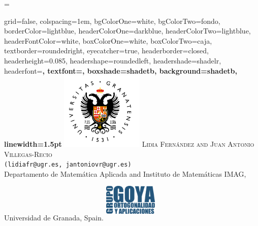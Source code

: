\documentclass[portrait,final,a0paper,fontscale=0.38]{baposter}
\begin{document}
\emergencystretch=\maxdimen
{}
\begin{poster}%
  {
  grid=false,
  colspacing=1em,
  bgColorOne=white,
  bgColorTwo=fondo,
  borderColor=lightblue,
  headerColorOne=darkblue,
  headerColorTwo=lightblue,
  headerFontColor=white,
  boxColorOne=white,
  boxColorTwo=caja,
 textborder=roundedright,
  eyecatcher=true,
  headerborder=closed,
  headerheight=0.085\textheight,
  headershape=roundedleft,
  headershade=shadelr,
  headerfont=\Large\bf\textsc, %
  textfont={\setlength{\parindent}{1.5em}},
  boxshade=shadetb,
  background=shadetb,
  linewidth=1.5pt
  }
  {
  	\includegraphics[height=10em]{ugr}
  }
  {
  	\medskip
  	{\scalebox{1.4}{\LARGE{\bf\textsc{\textcolor{darkblue}{Multiple Orthogonal Polynomials in Two Variables}}}}}
  }
  {
  	\textsc{Lidia Fernández and Juan Antonio Villegas-Recio}
  	\\
  	\small{\texttt{(lidiafr@ugr.es, jantoniovr@ugr.es)}}
  	\\
  	\normalsize{Departamento de Matem\'{a}tica Aplicada and Instituto de Matemáticas IMAG, Universidad de Granada, Spain.}
  }
  {
  	\includegraphics[height=5.8em,width=6.9em]{goya}
  }



    \newcommand{\colouredcircle}{%
      \tikz{\useasboundingbox (-0.2em,-0.32em) rectangle(0.2em,0.32em); \draw[draw=black,fill=lightblue,line width=0.03em] (0,0) circle(0.18em);}}


\end{poster}
\end{document}
